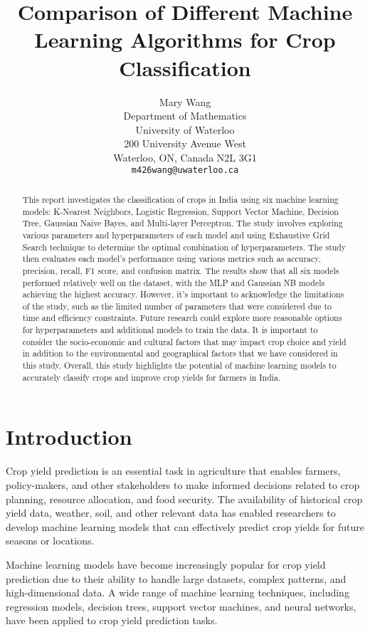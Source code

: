 \documentclass{article}
\title{Comparison of Different Machine Learning Algorithms for Crop Classification}
\author{%
  Mary Wang \\
  Department of Mathematics\\
  University of Waterloo\\
  200 University Avenue West\\
  Waterloo, ON, Canada  N2L 3G1 \\
  \texttt{m426wang@uwaterloo.ca}
}
\begin{document}
\maketitle

\begin{abstract}

This report investigates the classification of crops in India using six machine learning models: K-Nearest Neighbors, Logistic Regression, Support Vector Machine, Decision Tree, Gaussian Naive Bayes, and Multi-layer Perceptron. The study involves exploring various parameters and hyperparameters of each model and using Exhaustive Grid Search technique to determine the optimal combination of hyperparameters. The study then evaluates each model's performance using various metrics such as accuracy, precision, recall, F1 score, and confusion matrix. The results show that all six models performed relatively well on the dataset, with the MLP and Gaussian NB models achieving the highest accuracy. However, it's important to acknowledge the limitations of the study, such as the limited number of parameters that were considered due to time and efficiency constraints. Future research could explore more reasonable options for hyperparameters and additional models to train the data. It is important to consider the socio-economic and cultural factors that may impact crop choice and yield in addition to the environmental and geographical factors that we have considered in this study. Overall, this study highlights the potential of machine learning models to accurately classify crops and improve crop yields for farmers in India.
  
\end{abstract}

\section{Introduction}

Crop yield prediction is an essential task in agriculture that enables farmers, policy-makers, and other stakeholders to make informed decisions related to crop planning, resource allocation, and food security. The availability of historical crop yield data, weather, soil, and other relevant data has enabled researchers to develop machine learning models that can effectively predict crop yields for future seasons or locations.
  
  Machine learning models have become increasingly popular for crop yield prediction due to their ability to handle large datasets, complex patterns, and high-dimensional data. A wide range of machine learning techniques, including regression models, decision trees, support vector machines, and neural networks, have been applied to crop yield prediction tasks.
\end{document}
